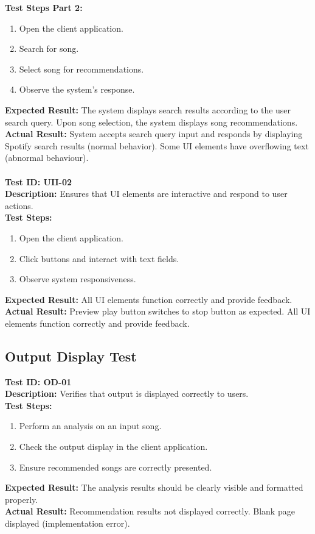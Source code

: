 \documentclass[12pt, titlepage]{article}
\begin{document}
\textbf{Test Steps Part 2:}
\begin{enumerate}
    \item Open the client application.
    \item Search for song.
    \item Select song for recommendations.
    \item Observe the system's response.
\end{enumerate}
\textbf{Expected Result:} The system displays search results according to the user search query. Upon song selection, the system displays song recommendations.\\
\textbf{Actual Result:} System accepts search query input and responds by displaying Spotify search results (normal behavior). Some UI elements have overflowing text (abnormal behaviour).
\\ \\
\textbf{Test ID: UII-02}\\
\textbf{Description:} Ensures that UI elements are interactive and respond to user actions.\\
\textbf{Test Steps:}
\begin{enumerate}
    \item Open the client application.
    \item Click buttons and interact with text fields.
    \item Observe system responsiveness.
\end{enumerate}
\textbf{Expected Result:} All UI elements function correctly and provide feedback.\\
\textbf{Actual Result:} Preview play button switches to stop button as expected. All UI elements function correctly and provide feedback.

\subsection{Output Display Test}
\textbf{Test ID: OD-01}\\
\textbf{Description:} Verifies that output is displayed correctly to users.\\
\textbf{Test Steps:}
\begin{enumerate}
    \item Perform an analysis on an input song.
    \item Check the output display in the client application.
    \item Ensure recommended songs are correctly presented.
\end{enumerate}
\textbf{Expected Result:} The analysis results should be clearly visible and formatted properly.\\
\textbf{Actual Result:} Recommendation results not displayed correctly. Blank page displayed (implementation error).
\end{document}
